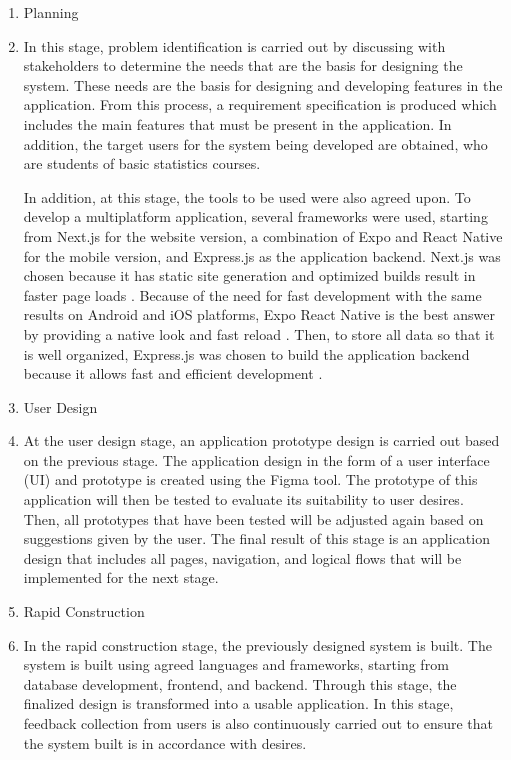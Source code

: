 \documentclass[conference,a4paper]{IEEEtran}
\begin{document}
\begin{enumerate}
  \item Planning
  \item[] In this stage, problem identification is carried out by discussing with stakeholders to determine the needs that are the basis for designing the system. These needs are the basis for designing and developing features in the application. From this process, a requirement specification is produced which includes the main features that must be present in the application. In addition, the target users for the system being developed are obtained, who are students of basic statistics courses.

        In addition, at this stage, the tools to be used were also agreed upon. To develop a multiplatform application, several frameworks were used, starting from Next.js for the website version, a combination of Expo and React Native for the mobile version, and Express.js as the application backend. Next.js was chosen because it has static site generation and optimized builds result in faster page loads \cite{b9}. Because of the need for fast development with the same results on Android and iOS platforms, Expo React Native is the best answer by providing a native look and fast reload \cite{b10}. Then, to store all data so that it is well organized, Express.js was chosen to build the application backend because it allows fast and efficient development \cite{b11}.

  \item User Design
  \item [] At the user design stage, an application prototype design is carried out based on the previous stage. The application design in the form of a user interface (UI) and prototype is created using the Figma tool. The prototype of this application will then be tested to evaluate its suitability to user desires. Then, all prototypes that have been tested will be adjusted again based on suggestions given by the user. The final result of this stage is an application design that includes all pages, navigation, and logical flows that will be implemented for the next stage.

  \item Rapid Construction
  \item [] In the rapid construction stage, the previously designed system is built. The system is built using agreed languages and frameworks, starting from database development, frontend, and backend. Through this stage, the finalized design is transformed into a usable application. In this stage, feedback collection from users is also continuously carried out to ensure that the system built is in accordance with desires.


\end{enumerate}
\end{document}
